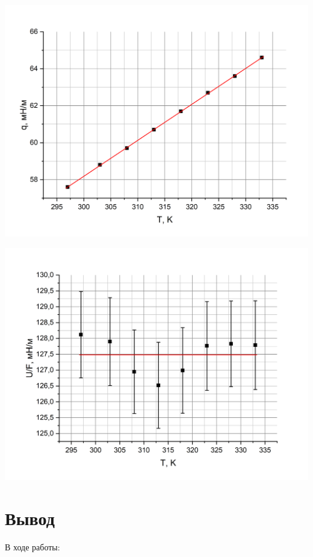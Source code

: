 \documentclass[a4paper,12pt]{article} %
\begin{document}
{\begin{minipage}{.50\textwidth}
  \centering
  \includegraphics[scale={0.38}]{2.png}
\end{minipage}
\begin{minipage}{.50\textwidth}
  \centering
  \includegraphics[scale={0.38}]{3.png}
\end{minipage}


\newpage
\section{Вывод}

\medskip

\noindent В ходе работы:

}
\end{document}
